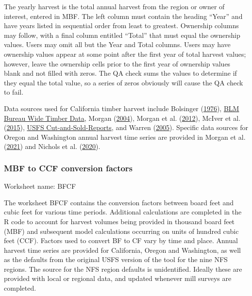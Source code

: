 \documentclass[
  openany]{book}
\begin{document}
The yearly harvest is the total annual harvest from the region or owner
of interest, entered in MBF. The left column must contain the heading
``Year'' and have years listed in sequential order from least to
greatest. Ownership columns may follow, with a final column entitled
``Total'' that must equal the ownership values. Users may omit all but
the Year and Total columns. Users may have ownership values appear at
some point after the first year of total harvest values; however, leave
the ownership cells prior to the first year of ownership values blank
and not filled with zeros. The QA check sums the values to determine if
they equal the total value, so a series of zeros obviously will cause
the QA check to fail.

Data sources used for California timber harvest include Bolsinger
(\protect\hyperlink{ref-bolsinger1976}{1976}),
\href{https://www.blm.gov/programs/natural-resources/forests-and-woodlands/timber-sales/bureau-wide-timber-data}{BLM
Bureau Wide Timber Data}, Morgan
(\protect\hyperlink{ref-morgan2004}{2004}), Morgan et al.
(\protect\hyperlink{ref-morgan2012}{2012}), McIver et al.
(\protect\hyperlink{ref-mciver2015}{2015}),
\href{https://www.fs.fed.us/forestmanagement/products/cut-sold/index.shtml}{USFS
Cut-and-Sold-Reports}, and Warren
(\protect\hyperlink{ref-warren2005}{2005}). Specific data sources for
Oregon and Washington annual harvest time series are provided in Morgan
et al. (\protect\hyperlink{ref-morgan2021}{2021}) and Nichols et al.
(\protect\hyperlink{ref-nichols2020}{2020}).

\hypertarget{own-prov-input-bfcf}{%
\subsubsection{MBF to CCF conversion
factors}\label{own-prov-input-bfcf}}

Worksheet name: BFCF

The worksheet BFCF contains the conversion factors between board feet
and cubic feet for various time periods. Additional calculations are
completed in the R code to account for harvest volumes being provided in
thousand board feet (MBF) and subsequent model calculations occurring on
units of hundred cubic feet (CCF). Factors used to convert BF to CF vary
by time and place. Annual harvest time series are provided for
California, Oregon and Washington, as well as the defaults from the
original USFS version of the tool for the nine NFS regions. The source
for the NFS region defaults is unidentified. Ideally these are provided
with local or regional data, and updated whenever mill surveys are
completed.
\end{document}
